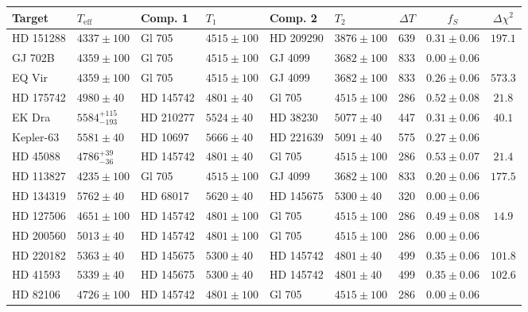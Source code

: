 \begin{tiny}
\begin{longtable}{ll|ll|ll|rcc}
Target & $T_\mathrm{eff}$ & Comp. 1 & $T_1$ & Comp. 2 & $T_2$ & $\Delta T$ & $f_S$ & $\Delta \chi^2$ \\ \hline
HD 151288 & $4337 \pm 100$ & Gl 705 & $4515 \pm 100$ & HD 209290 & $3876 \pm 100$ & 639  & $0.31 \pm 0.06$ & $197.1$ \\
GJ 702B & $4359 \pm 100$ & Gl 705 & $4515 \pm 100$ & GJ 4099 & $3682 \pm 100$ & 833 & $0.00 \pm 0.06$ &  \\
EQ Vir & $4359 \pm 100$ & Gl 705 & $4515 \pm 100$ & GJ 4099 & $3682 \pm 100$ & 833 & $0.26 \pm 0.06$ & $573.3$ \\
HD 175742 & $4980 \pm 40$ & HD 145742 & $4801 \pm 40$ & Gl 705 & $4515 \pm 100$ & 286  & $0.52 \pm 0.08$ & $21.8$ \\
EK Dra & $5584^{+115}_{-193}$ & HD 210277 & $5524 \pm 40$ & HD 38230 & $5077 \pm 40$ & 447 & $0.31 \pm 0.06$ & $40.1$ \\
Kepler-63 & $5581 \pm 40$ & HD 10697 & $5666 \pm 40$ & HD 221639 & $5091 \pm 40$ & 575 & $0.27 \pm 0.06$ &  \\
HD 45088 & $4786^{+39}_{-36}$ & HD 145742 & $4801 \pm 40$ & Gl 705 & $4515 \pm 100$ & 286 & $0.53 \pm 0.07$ & $21.4$ \\
HD 113827 & $4235 \pm 100$ & Gl 705 & $4515 \pm 100$ & GJ 4099 & $3682 \pm 100$ & 833 & $0.20 \pm 0.06$ & $177.5$ \\
HD 134319 & $5762 \pm 40$ & HD 68017 & $5620 \pm 40$ & HD 145675 & $5300 \pm 40$ & 320  & $0.00 \pm 0.06$ &  \\
HD 127506 & $4651 \pm 100$ & HD 145742 & $4801 \pm 100$ & Gl 705 & $4515 \pm 100$ & 286 & $0.49 \pm 0.08$ & $14.9$ \\
HD 200560 & $5013 \pm 40$ & HD 145742 & $4801 \pm 100$ & Gl 705 & $4515 \pm 100$ & 286 & $0.00 \pm 0.06$ &  \\
HD 220182 & $5363 \pm 40$ & HD 145675 & $5300 \pm 40$ & HD 145742 & $4801 \pm 40$ & 499 & $0.35 \pm 0.06$ & $101.8$ \\
HD 41593 & $5339 \pm 40$ & HD 145675 & $5300 \pm 40$ & HD 145742 & $4801 \pm 40$ & 499 & $0.35 \pm 0.06$ & $102.6$ \\
HD 82106 & $4726 \pm 100$ & HD 145742 & $4801 \pm 100$ & Gl 705 & $4515 \pm 100$ & 286 & $0.00 \pm 0.06$ &  \\

\end{longtable}
\end{tiny}
